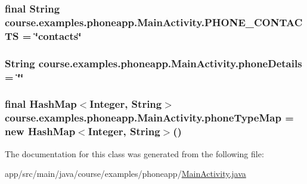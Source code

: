 \subsubsection[{P\+H\+O\+N\+E\+\_\+\+C\+O\+N\+T\+A\+C\+T\+S}]{\setlength{\rightskip}{0pt plus 5cm}final String course.\+examples.\+phoneapp.\+Main\+Activity.\+P\+H\+O\+N\+E\+\_\+\+C\+O\+N\+T\+A\+C\+T\+S = \char`\"{}contacts\char`\"{}\hspace{0.3cm}{\ttfamily [static]}}\label{classcourse_1_1examples_1_1phoneapp_1_1_main_activity_a60a240e7bcd23f7fa0b2c9e78d19fffb}
\hypertarget{classcourse_1_1examples_1_1phoneapp_1_1_main_activity_a2e49349c76e07dceda2b968b25b2f12e}{}
\subsubsection[{phone\+Details}]{\setlength{\rightskip}{0pt plus 5cm}String course.\+examples.\+phoneapp.\+Main\+Activity.\+phone\+Details = \char`\"{}\char`\"{}}\label{classcourse_1_1examples_1_1phoneapp_1_1_main_activity_a2e49349c76e07dceda2b968b25b2f12e}
\hypertarget{classcourse_1_1examples_1_1phoneapp_1_1_main_activity_a2b0ca4e6cb7439dbf892e504baa83c14}{}
\subsubsection[{phone\+Type\+Map}]{\setlength{\rightskip}{0pt plus 5cm}final Hash\+Map$<$Integer, String$>$ course.\+examples.\+phoneapp.\+Main\+Activity.\+phone\+Type\+Map = new Hash\+Map$<$Integer, String$>$()\hspace{0.3cm}{\ttfamily [static]}}\label{classcourse_1_1examples_1_1phoneapp_1_1_main_activity_a2b0ca4e6cb7439dbf892e504baa83c14}


The documentation for this class was generated from the following file\+:\begin{DoxyCompactItemize}
\item 
app/src/main/java/course/examples/phoneapp/\hyperlink{_main_activity_8java}{Main\+Activity.\+java}\end{DoxyCompactItemize}
